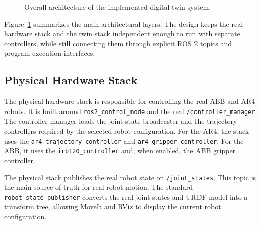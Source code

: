 \begin{figure}[H]
{%
    }
    \caption{Overall architecture of the implemented digital twin system.}
    \label{fig:dt_overall_architecture}
\end{figure}

Figure~\ref{fig:dt_overall_architecture} summarizes the main architectural layers. The design keeps the real hardware stack and the twin stack independent enough to run with separate controllers, while still connecting them through explicit ROS 2 topics and program execution interfaces.

\subsection{Physical Hardware Stack}

The physical hardware stack is responsible for controlling the real ABB and AR4 robots. It is built around \texttt{ros2\_control\_node} and the real \texttt{/controller\_manager}. The controller manager loads the joint state broadcaster and the trajectory controllers required by the selected robot configuration. For the AR4, the stack uses the \texttt{ar4\_trajectory\_controller} and \texttt{ar4\_gripper\_controller}. For the ABB, it uses the \texttt{irb120\_controller} and, when enabled, the ABB gripper controller.

The physical stack publishes the real robot state on \texttt{/joint\_states}. This topic is the main source of truth for real robot motion. The standard \texttt{robot\_state\_publisher} converts the real joint states and URDF model into a transform tree, allowing MoveIt and RViz to display the current robot configuration.

